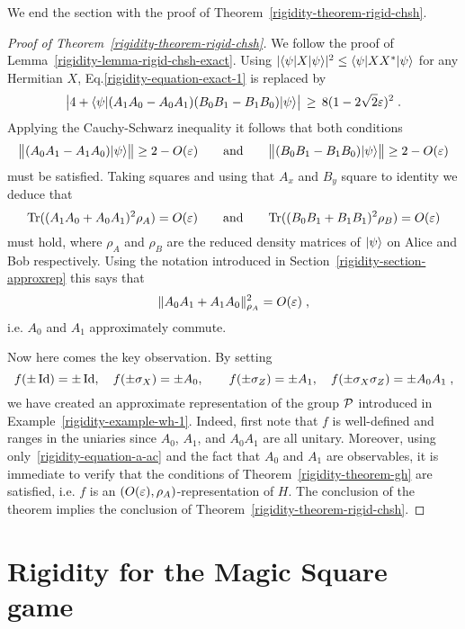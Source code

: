 We end the section with the proof of Theorem~\ref{rigidity-theorem-rigid-chsh}.

\begin{proof}[Proof of Theorem~\ref{rigidity-theorem-rigid-chsh}]
We follow the proof of Lemma~\ref{rigidity-lemma-rigid-chsh-exact}. Using $|\langle\psi|X|\psi\rangle|^2 \leq \langle\psi|XX^*|\psi\rangle$ for any Hermitian $X$,
Eq.\eqref{rigidity-equation-exact-1} is replaced by
\[ \big|4+\langle\psi|(A_1A_0-A_0A_1) (B_0B_1-B_1B_0)|\psi\rangle \big|\,\geq\, 8(1-2\sqrt{2}\varepsilon)^2\;.\]
Applying the Cauchy-Schwarz inequality it follows that both conditions
\[ \big\|(A_0A_1-A_1A_0)|\psi\rangle\big\| \geq 2-O(\varepsilon) \qquad \text{and}\qquad\big\|(B_0B_1-B_1B_0)|\psi\rangle\big\| \geq 2-O(\varepsilon)\]
must be satisfied. Taking squares and using that $A_x$ and $B_y$ square to identity we deduce that 
$$\mathrm{Tr}((A_1A_0 + A_0A_1)^2\rho_A) = O({\varepsilon})\qquad \text{and}\qquad \mathrm{Tr}((B_0B_1+B_1B_1)^2 \rho_B) = O({\varepsilon})$$
must hold, where $\rho_A$ and $\rho_B$ are the reduced density matrices of $|\psi\rangle$ on Alice and Bob respectively. 
Using the notation introduced in Section~\ref{rigidity-section-approxrep} this says that 
\begin{equation}\label{rigidity-equation-a-ac}
\|A_0A_1 + A_1A_0\|_{\rho_A}^2 = O({\varepsilon})\;,
\end{equation}
 i.e. $A_0$ and $A_1$ approximately commute. 

Now here comes the key observation. By setting 
$$ f(\pm \mathop{\rm Id}\nolimits)=\pm\mathop{\rm Id}\nolimits,\quad f(\pm\sigma_X)=\pm A_0,\quad\quad f(\pm\sigma_Z)=\pm A_1,\quad f(\pm\sigma_X\sigma_Z) = \pm A_0A_1\;,$$
we have created an approximate representation of the group $\mathcal{P}$ introduced in Example~\ref{rigidity-example-wh-1}. Indeed, first note that $f$ is well-defined and ranges in the uniaries since $A_0$, $A_1$, and $A_0A_1$ are all unitary. Moreover, using only~\eqref{rigidity-equation-a-ac} and the fact that $A_0$ and $A_1$ are observables, it is immediate to verify that the conditions of Theorem~\ref{rigidity-theorem-gh} are satisfied, i.e. $f$ is an $(O({\varepsilon}),\rho_A)$-representation of $H$. The conclusion of the theorem implies the conclusion of Theorem~\ref{rigidity-theorem-rigid-chsh}.
\end{proof}



\section{Rigidity for the Magic Square game}
\label{section-msrigid}

